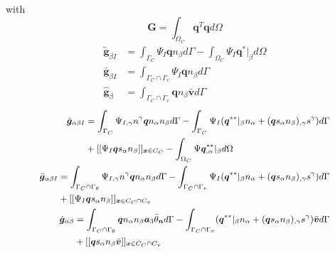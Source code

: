 with
\begin{equation}
\boldsymbol G = \int_{\Omega_C} \boldsymbol q^T \boldsymbol q d\Omega
\end{equation}
\begin{subequations}
\begin{align}
\tilde{\boldsymbol g}_{\beta I} &= \int_{\Gamma_C} \Psi_I \boldsymbol q n_\beta d\Gamma
- \int_{\Omega_C} \Psi_I \boldsymbol q^*\vert_\beta d\Omega \\
\bar{\boldsymbol g}_{\beta I} &= \int_{\Gamma_C\cap\Gamma_v} \Psi_I \boldsymbol q n_\beta d\Gamma \\
\hat{\boldsymbol g}_{\beta} &= \int_{\Gamma_C\cap\Gamma_v} \boldsymbol q n_\beta \bar{\boldsymbol v} d\Gamma 
\end{align}
\end{subequations}
\begin{subequations}
\begin{align}
\small
\begin{split}
\tilde{\boldsymbol g}_{\alpha\beta I} &= \int_{\Gamma_C} \Psi_{I,\gamma}n^\gamma \boldsymbol q n_\alpha n_\beta d\Gamma 
- \int_{\Gamma_C} \Psi_I(\boldsymbol q^{**}\vert_\beta n_\alpha + (\boldsymbol q s_\alpha n_\beta)_{,\gamma}s^\gamma) d\Gamma \\
&+ [[\Psi_I \boldsymbol q s_\alpha n_\beta]]_{\boldsymbol x\in C_C}
- \int_{\Omega_C} \Psi \boldsymbol q^{**}_{,\alpha}\vert_\beta d\Omega \\
\end{split} \\
\small
\begin{split}
\bar{\boldsymbol g}_{\alpha\beta I} &= \int_{\Gamma_C\cap\Gamma_\theta} \Psi_{I,\gamma}n^\gamma \boldsymbol q n_\alpha n_\beta d\Gamma 
- \int_{\Gamma_C\cap\Gamma_v} \Psi_I(\boldsymbol q^{**}\vert_\beta n_\alpha + (\boldsymbol q s_\alpha n_\beta)_{,\gamma}s^\gamma) d\Gamma \\
&+ [[\Psi_I \boldsymbol q s_\alpha n_\beta]]_{\boldsymbol x\in C_C\cap C_v}
\end{split} \\
\small
\begin{split}
\hat{\boldsymbol g}_{\alpha\beta} &= \int_{\Gamma_C\cap\Gamma_\theta} \boldsymbol q n_\alpha n_\beta \boldsymbol a_3 \bar{\theta}_{\boldsymbol n} d\Gamma 
- \int_{\Gamma_C\cap\Gamma_v}(\boldsymbol q^{**}\vert_\beta n_\alpha + (\boldsymbol q s_\alpha n_\beta)_{,\gamma}s^\gamma)\bar{\boldsymbol v} d\Gamma \\
&+ [[\boldsymbol q s_\alpha n_\beta \bar{\boldsymbol v}]]_{\boldsymbol x\in C_C\cap C_v}
\end{split}
\end{align}
\end{subequations}
